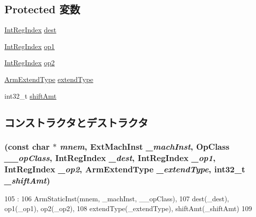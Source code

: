 \subsection*{Protected 変数}
\begin{DoxyCompactItemize}
\item 
\hyperlink{namespaceArmISA_ae64680ba9fb526106829d6bf92fc791b}{IntRegIndex} \hyperlink{classArmISA_1_1DataXERegOp_aec72e8e45bdc87abeeeb75d2a8a9a716}{dest}
\item 
\hyperlink{namespaceArmISA_ae64680ba9fb526106829d6bf92fc791b}{IntRegIndex} \hyperlink{classArmISA_1_1DataXERegOp_a4c465c43ad568f8bcf8ae71480e9cfea}{op1}
\item 
\hyperlink{namespaceArmISA_ae64680ba9fb526106829d6bf92fc791b}{IntRegIndex} \hyperlink{classArmISA_1_1DataXERegOp_a7799ff6cbe5a252199059eb8665820e7}{op2}
\item 
\hyperlink{namespaceArmISA_a4420842b5673543552a3aba317c69dbb}{ArmExtendType} \hyperlink{classArmISA_1_1DataXERegOp_adfa062f20232570cb00f2404d6243086}{extendType}
\item 
int32\_\-t \hyperlink{classArmISA_1_1DataXERegOp_a378dfadeb317c390962c147be928d92d}{shiftAmt}
\end{DoxyCompactItemize}


\subsection{コンストラクタとデストラクタ}
\hypertarget{classArmISA_1_1DataXERegOp_a98dcf248cf9e3deff3530cab32aa09ea}{
\subsubsection[{DataXERegOp}]{ (const char $\ast$ {\em mnem}, \/  {\bf ExtMachInst} {\em \_\-machInst}, \/  OpClass {\em \_\-\_\-opClass}, \/  {\bf IntRegIndex} {\em \_\-dest}, \/  {\bf IntRegIndex} {\em \_\-op1}, \/  {\bf IntRegIndex} {\em \_\-op2}, \/  {\bf ArmExtendType} {\em \_\-extendType}, \/  int32\_\-t {\em \_\-shiftAmt})}}
\label{classArmISA_1_1DataXERegOp_a98dcf248cf9e3deff3530cab32aa09ea}



\begin{DoxyCode}
105                                                               :
106         ArmStaticInst(mnem, _machInst, __opClass),
107         dest(_dest), op1(_op1), op2(_op2),
108         extendType(_extendType), shiftAmt(_shiftAmt)
109     {}

\end{DoxyCode}



